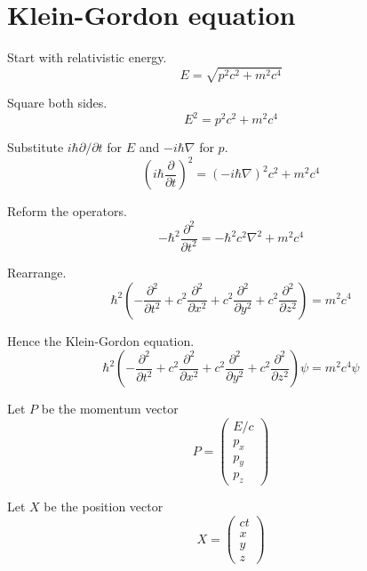 

\section*{Klein-Gordon equation}

Start with relativistic energy.
\begin{equation*}
E=\sqrt{p^2c^2+m^2c^4}
\end{equation*}

Square both sides.
\begin{equation*}
E^2=p^2c^2+m^2c^4
\end{equation*}

Substitute $i\hbar\partial/\partial t$ for $E$ and $-i\hbar\nabla$ for $p$.
\begin{equation*}
\left(i\hbar\frac{\partial}{\partial t}\right)^2
=\left(-i\hbar\nabla\right)^2c^2+m^2c^4
\end{equation*}

Reform the operators.
\begin{equation*}
-\hbar^2\frac{\partial^2}{\partial t^2}=-\hbar^2c^2\nabla^2+m^2c^4
\end{equation*}

Rearrange.
\begin{equation*}
\hbar^2\left(-\frac{\partial^2}{\partial t^2}
+c^2\frac{\partial^2}{\partial x^2}
+c^2\frac{\partial^2}{\partial y^2}
+c^2\frac{\partial^2}{\partial z^2}\right)=m^2c^4
\end{equation*}

Hence the Klein-Gordon equation.
\begin{equation*}
\hbar^2\left(-\frac{\partial^2}{\partial t^2}
+c^2\frac{\partial^2}{\partial x^2}
+c^2\frac{\partial^2}{\partial y^2}
+c^2\frac{\partial^2}{\partial z^2}\right)\psi=m^2c^4\psi
\end{equation*}

Let $P$ be the momentum vector
\begin{equation*}
P=\begin{pmatrix}E/c\\p_x\\p_y\\p_z\end{pmatrix}
\end{equation*}

Let $X$ be the position vector
\begin{equation*}
X=\begin{pmatrix}ct\\x\\y\\z\end{pmatrix}
\end{equation*}


